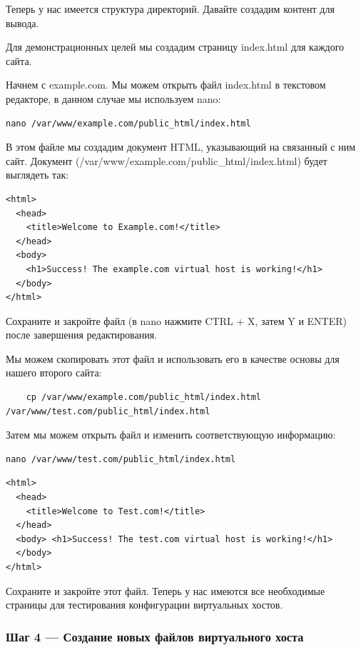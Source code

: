 \documentclass[14pt, a4paper]{article}
\begin{document}
Теперь у нас имеется структура директорий. Давайте создадим контент для вывода.

Для демонстрационных целей мы создадим страницу index.html для каждого сайта.

Начнем с example.com. Мы можем открыть файл index.html в текстовом редакторе, в данном случае мы используем nano:

\begin{lstlisting}
nano /var/www/example.com/public_html/index.html
\end{lstlisting}

В этом файле мы создадим документ HTML, указывающий на связанный с ним сайт. Документ 
(/var/www/example.com/public\_html/index.html) будет выглядеть так:

\begin{lstlisting}
<html>
  <head>
    <title>Welcome to Example.com!</title>
  </head>
  <body>
    <h1>Success! The example.com virtual host is working!</h1>
  </body>
</html>
\end{lstlisting}

Сохраните и закройте файл (в nano нажмите CTRL + X, затем Y и ENTER) после завершения редактирования.

Мы можем скопировать этот файл и использовать его в качестве основы для нашего второго сайта:

\begin{lstlisting}
    cp /var/www/example.com/public_html/index.html /var/www/test.com/public_html/index.html
\end{lstlisting}

Затем мы можем открыть файл и изменить соответствующую информацию:

\begin{lstlisting}
nano /var/www/test.com/public_html/index.html
\end{lstlisting}


\begin{lstlisting}
<html>
  <head>
    <title>Welcome to Test.com!</title>
  </head>
  <body> <h1>Success! The test.com virtual host is working!</h1>
  </body>
</html>
\end{lstlisting}

Сохраните и закройте этот файл. Теперь у нас имеются все 
необходимые страницы для тестирования конфигурации виртуальных хостов.


\subsubsection*{Шаг 4 — Создание новых файлов виртуального хоста}
\end{document}
